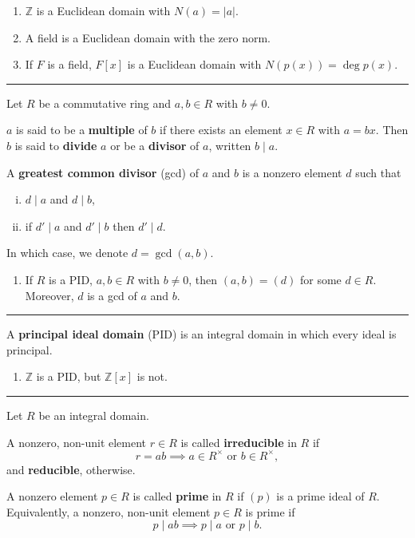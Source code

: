 \documentclass[12pt]{article}
\newcommand{\keyword}[1]{\textbf{#1}}
\newcommand{\sepline}{\rule{\textwidth}{0.4pt}}
\theoremstyle{definition}
\newcommand{\Z}{\mathbb{Z}}
\newcommand{\<}{\left\langle}
\renewcommand{\>}{\right\rangle}
\newcommand{\divides}{\mid}
\begin{document}
\begin{enumerate}
    \item $\Z$ is a Euclidean domain with $N(a) = |a|$.
    
    \item A field is a Euclidean domain with the zero norm.
    
    \item If $F$ is a field, $F[x]$ is a Euclidean domain with $N(p(x)) = \deg p(x)$.
\end{enumerate}

\sepline

Let $R$ be a commutative ring and $a, b \in R$ with $b \ne 0$.

$a$ is said to be a \keyword{multiple} of $b$ if there exists an element $x \in R$ with $a = bx$. Then $b$ is said to \keyword{divide} $a$ or be a \keyword{divisor} of $a$, written $b \divides a$.

A \keyword{greatest common divisor} (gcd) of $a$ and $b$ is a nonzero element $d$ such that
\begin{enumerate}[(i)]
    \item $d \divides a$ and $d \divides b$,
    \item if $d' \divides a$ and $d' \divides b$ then $d' \divides d$.
\end{enumerate}
In which case, we denote $d = \gcd(a, b)$.

\begin{enumerate}
    \item If $R$ is a PID, $a, b \in R$ with $b \ne 0$, then $(a, b) = (d)$ for some $d \in R$. Moreover, $d$ is a gcd of $a$ and $b$.
\end{enumerate}

\sepline

A \keyword{principal ideal domain} (PID) is an integral domain in which every ideal is principal.

\begin{enumerate}
    \item $\Z$ is a PID, but $\Z[x]$ is not.
\end{enumerate}

\sepline

Let $R$ be an integral domain.

A nonzero, non-unit element $r \in R$ is called \keyword{irreducible} in $R$ if
\[
    r = ab \implies a \in R^\times \text{ or } b \in R^\times,
\]
and \keyword{reducible}, otherwise.

A nonzero element $p \in R$ is called \keyword{prime} in $R$ if $(p)$ is a prime ideal of $R$. Equivalently, a nonzero, non-unit element $p \in R$ is prime  if
\[
    p \divides ab \implies p \divides a \text{ or } p \divides b.
\]
\end{document}
